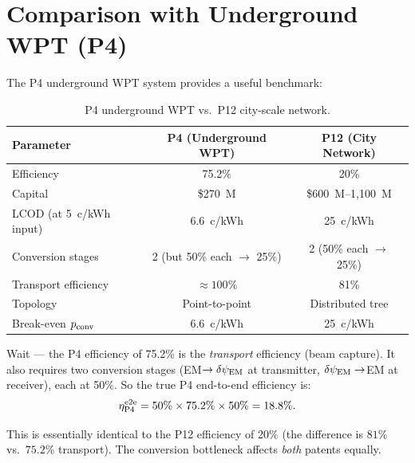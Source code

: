\documentclass[11pt]{article}
\newcommand{\dpsiEM}{\delta\psi_{\rm EM}}
\begin{document}
\section{Comparison with Underground WPT (P4)}
\label{sec:P12-vs-P4}

The P4 underground WPT system provides a useful benchmark:

\begin{table}[h]
\centering
\caption{P4 underground WPT vs.\ P12 city-scale network.}
\label{tab:P4-vs-P12}
\begin{tabular}{@{}lcc@{}}
\toprule
Parameter & P4 (Underground WPT) & P12 (City Network) \\
\midrule
Efficiency & 75.2\% & 20\% \\
Capital & \$270~M & \$600~M--1,100~M \\
LCOD (at 5~c/kWh input) & 6.6~c/kWh & 25~c/kWh \\
Conversion stages & 2 (but 50\% each $\to$ 25\%) & 2 (50\% each $\to$ 25\%) \\
Transport efficiency & $\approx 100\%$ & 81\% \\
Topology & Point-to-point & Distributed tree \\
Break-even $p_{\rm conv}$ & 6.6~c/kWh & 25~c/kWh \\
\bottomrule
\end{tabular}
\end{table}

Wait --- the P4 efficiency of 75.2\% is the \emph{transport} efficiency
(beam capture). It also requires two conversion stages (EM$\to\dpsiEM$
at transmitter, $\dpsiEM\to$EM at receiver), each at 50\%. So the true
P4 end-to-end efficiency is:
\begin{equation}
\eta_{\rm P4}^{\rm e2e} = 50\% \times 75.2\% \times 50\% = 18.8\%.
\end{equation}

This is essentially identical to the P12 efficiency of 20\% (the
difference is $81\%$ vs.\ $75.2\%$ transport). The conversion
bottleneck affects \emph{both} patents equally.
\end{document}
